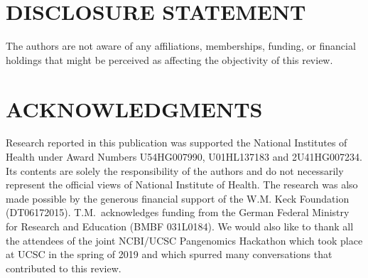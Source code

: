 
\section*{DISCLOSURE STATEMENT}
The authors are not aware of any affiliations, memberships, funding, or financial holdings that
might be perceived as affecting the objectivity of this review. 

\section*{ACKNOWLEDGMENTS}
Research reported in this publication was supported the National Institutes of Health under Award Numbers U54HG007990, U01HL137183 and 2U41HG007234. Its contents are solely the responsibility of the authors and do not necessarily represent the official views of National Institute of Health. The research was also made possible by the generous financial support of the W.M. Keck Foundation (DT06172015). T.M.\ acknowledges funding from the German Federal Ministry for Research and Education (BMBF 031L0184). We would also like to thank all the attendees of the joint NCBI/UCSC Pangenomics Hackathon which took place at UCSC in the spring of 2019 and which spurred many conversations that contributed to this review.
